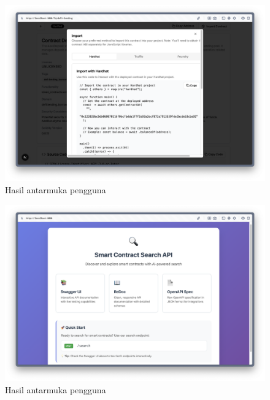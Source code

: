 \begin{figure}[ht]
	\centering
	\includegraphics[width=1\textwidth]{resources/appendix/hasil-gui-4.png}
	\caption{Hasil antarmuka pengguna}
	\label{image:hasil-gui-4}
\end{figure}

\begin{figure}[ht]
	\centering
	\includegraphics[width=1\textwidth]{resources/appendix/hasil-api-1.png}
	\caption{Hasil antarmuka pengguna}
	\label{image:hasil-api-1}
\end{figure}

